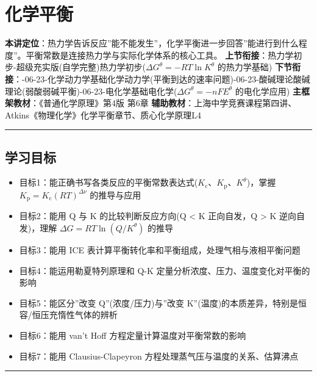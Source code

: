 \section{化学平衡}\label{ux5316ux5b66ux5e73ux8861}

\textbf{本讲定位}：热力学告诉反应''能不能发生''，化学平衡进一步回答''能进行到什么程度''。平衡常数是连接热力学与实际化学体系的核心工具。
\textbf{上节衔接}： 热力学初步-超级充实版(自学完整)\textbar 热力学初步(\(\Delta G^\theta = -RT \ln K^\theta\) 的热力学基础)
\textbf{下节衔接}：-06-23-化学动力学基础\textbar 化学动力学(平衡到达的速率问题)-06-23-酸碱理论\textbar 酸碱理论(弱酸弱碱平衡)-06-23-电化学基础\textbar 电化学(\(\Delta G^\theta = -nFE^\theta\) 的电化学应用)
\textbf{主框架教材}：《普通化学原理》第4版 第6章
\textbf{辅助教材}：上海中学竞赛课程第四讲、Atkins《物理化学》化学平衡章节、质心化学原理L4

\begin{center}\rule{0.5\linewidth}{0.5pt}\end{center}

\subsection{学习目标}\label{ux5b66ux4e60ux76eeux6807}

\begin{itemize}
\tightlist
\item
  目标1：能正确书写各类反应的平衡常数表达式(\(K_{\mathrm c}\)、\(K_{\mathrm p}\)、\(K^\theta\))，掌握 \(K_{\mathrm p} = K_{\mathrm c}(RT)^{\Delta\nu}\) 的推导与应用
\item
  目标2：能用 Q 与 K 的比较判断反应方向(Q \textless{} K 正向自发，Q \textgreater{} K 逆向自发)，理解 \(\Delta G = RT \ln(Q/K^\theta)\) 的推导
\item
  目标3：能用 ICE 表计算平衡转化率和平衡组成，处理气相与液相平衡问题
\item
  目标4：能运用勒夏特列原理和 Q-K 定量分析浓度、压力、温度变化对平衡的影响
\item
  目标5：能区分''改变 Q''(浓度/压力)与''改变 K''(温度)的本质差异，特别是恒容/恒压充惰性气体的辨析
\item
  目标6：能用 van't Hoff 方程定量计算温度对平衡常数的影响
\item
  目标7：能用 Clausius-Clapeyron 方程处理蒸气压与温度的关系、估算沸点
\end{itemize}

\begin{center}\rule{0.5\linewidth}{0.5pt}\end{center}

